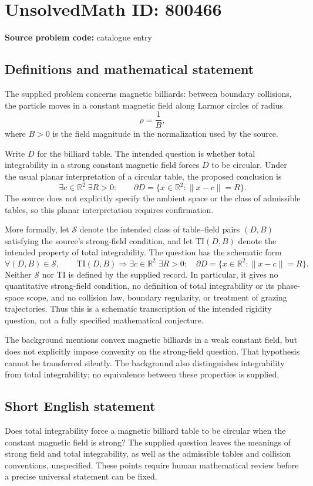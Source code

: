 \documentclass[11pt]{article}
\newcommand{\R}{\mathbb{R}}
\begin{document}
\section*{UnsolvedMath ID: 800466}
\textbf{Source problem code:} catalogue entry
\subsection{Definitions and mathematical statement}
The supplied problem concerns magnetic billiards: between boundary collisions, the particle moves in a constant magnetic field along Larmor circles of radius
\[
\rho=\frac{1}{B},
\]
where \(B>0\) is the field magnitude in the normalization used by the source.

Write \(D\) for the billiard table. The intended question is whether total integrability in a strong constant magnetic field forces \(D\) to be circular. Under the usual planar interpretation of a circular table, the proposed conclusion is
\[
\exists c\in\R^2\;\exists R>0:\qquad
\partial D=\{x\in\R^2:\lVert x-c\rVert=R\}.
\]
The source does not explicitly specify the ambient space or the class of admissible tables, so this planar interpretation requires confirmation.

More formally, let \(\mathcal S\) denote the intended class of table--field pairs \((D,B)\) satisfying the source's strong-field condition, and let \(\mathrm{TI}(D,B)\) denote the intended property of total integrability. The question has the schematic form
\[
\forall (D,B)\in\mathcal S,\qquad
\mathrm{TI}(D,B)
\Longrightarrow
\exists c\in\R^2\;\exists R>0:\quad
\partial D=\{x\in\R^2:\lVert x-c\rVert=R\}.
\]
Neither \(\mathcal S\) nor \(\mathrm{TI}\) is defined by the supplied record. In particular, it gives no quantitative strong-field condition, no definition of total integrability or its phase-space scope, and no collision law, boundary regularity, or treatment of grazing trajectories. Thus this is a schematic transcription of the intended rigidity question, not a fully specified mathematical conjecture.

The background mentions convex magnetic billiards in a weak constant field, but does not explicitly impose convexity on the strong-field question. That hypothesis cannot be transferred silently. The background also distinguishes integrability from total integrability; no equivalence between these properties is supplied.
\subsection{Short English statement}
Does total integrability force a magnetic billiard table to be circular when the constant magnetic field is strong? The supplied question leaves the meanings of strong field and total integrability, as well as the admissible tables and collision conventions, unspecified. These points require human mathematical review before a precise universal statement can be fixed.
\end{document}
